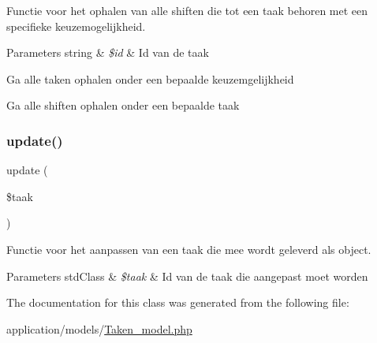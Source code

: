 Functie voor het ophalen van alle shiften die tot een taak behoren met een specifieke keuzemogelijkheid. 


\begin{DoxyParams}[1]{Parameters}
string & {\em \$id} & Id van de taak \\
\hline
\end{DoxyParams}
Ga alle taken ophalen onder een bepaalde keuzemgelijkheid

Ga alle shiften ophalen onder een bepaalde taak \mbox{\label{class_taken___model_a2fdc722cb2e60f87bc93a5f2390f88bc}} 
\subsubsection{\texorpdfstring{update()}{update()}}
{\footnotesize\ttfamily update (\begin{DoxyParamCaption}\item[{}]{\$taak }\end{DoxyParamCaption})}



Functie voor het aanpassen van een taak die mee wordt geleverd als object. 


\begin{DoxyParams}[1]{Parameters}
std\+Class & {\em \$taak} & Id van de taak die aangepast moet worden \\
\hline
\end{DoxyParams}


The documentation for this class was generated from the following file\+:\begin{DoxyCompactItemize}
\item 
application/models/\mbox{\hyperlink{_taken__model_8php}{Taken\+\_\+model.\+php}}\end{DoxyCompactItemize}
